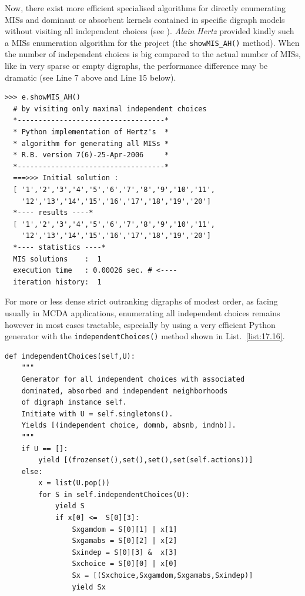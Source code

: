 Now, there exist more efficient specialised algorithms for directly enumerating MISs and dominant or absorbent kernels contained in specific digraph models without visiting all independent choices (see \citep{BIS-2006b}). \emph{Alain Hertz} provided kindly such a MISs enumeration algorithm for the \Digraph project (the \texttt{showMIS\_AH()} method). When the number of independent choices is big compared to the actual number of MISs, like in very sparse or empty digraphs, the performance difference may be dramatic (see Line 7 above and Line 15 below).
\begin{lstlisting}[caption={Enumerating MISs by visiting only maximal independent choices (\emph{A. Hertz}\index{Hertz@\emph{A. Hertz}}) },label=list:17.15]
>>> e.showMIS_AH()
  # by visiting only maximal independent choices
  *-----------------------------------*
  * Python implementation of Hertz's  *
  * algorithm for generating all MISs *
  * R.B. version 7(6)-25-Apr-2006     *
  *-----------------------------------*
  ===>>> Initial solution :
  [ '1','2','3','4','5','6','7','8','9','10','11',
    '12','13','14','15','16','17','18','19','20']
  *---- results ----*
  [ '1','2','3','4','5','6','7','8','9','10','11',
    '12','13','14','15','16','17','18','19','20']
  *---- statistics ----*
  MIS solutions    :  1
  execution time   : 0.00026 sec. # <----
  iteration history:  1
\end{lstlisting}

For more or less dense strict outranking digraphs of modest order, as facing usually in MCDA applications, enumerating all independent choices remains however in most cases tractable, especially by using a very efficient Python generator with the \texttt{independentChoices()} method shown in List.~\vref{list:17.16}.
\begin{lstlisting}[caption={Generating all independent choices in a digraph},label=list:17.16]
def independentChoices(self,U):
    """
    Generator for all independent choices with associated
    dominated, absorbed and independent neighborhoods
    of digraph instance self.
    Initiate with U = self.singletons().
    Yields [(independent choice, domnb, absnb, indnb)].
    """
    if U == []:
        yield [(frozenset(),set(),set(),set(self.actions))]
    else:
        x = list(U.pop())
        for S in self.independentChoices(U):
            yield S
            if x[0] <=  S[0][3]:
                Sxgamdom = S[0][1] | x[1]
                Sxgamabs = S[0][2] | x[2]
                Sxindep = S[0][3] &  x[3]
                Sxchoice = S[0][0] | x[0]
                Sx = [(Sxchoice,Sxgamdom,Sxgamabs,Sxindep)]
                yield Sx
\end{lstlisting}

